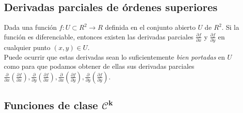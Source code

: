 \documentclass[a4paper, twoside]{article}
\numberwithin{equation}{section}
\numberwithin{figure}{section}
\numberwithin{table}{section}
\begin{document}
				\subsection{Derivadas parciales de órdenes superiores}

					Dada una función $f:U\subset R^2 \rightarrow R$ definida en el conjunto abierto $U$ de $R^2$. Si la función es diferenciable, entonces existen las derivadas parciales $\frac{\partial f}{\partial x}$ y $\frac{\partial f}{\partial y}$ en cualquier punto $(x,y)\in U$.\\
					
					Puede ocurrir que estas derivadas sean lo suficientemente \emph{bien	portadas} en $U$ como para que podamos obtener de ellas sus derivadas parciales $\frac{\partial}{\partial x}\left(\frac{\partial f}{\partial x}\right),\frac{\partial}{\partial y}\left(\frac{\partial f}{\partial x}\right),\frac{\partial}{\partial x}\left(\frac{\partial f}{\partial y}\right),\frac{\partial}{\partial y}\left(\frac{\partial f}{\partial y}\right)$.\\
					
				
				\subsection{Funciones de clase $\mathcal{C}^{\mathbf{k}}$}
				
\end{document}
